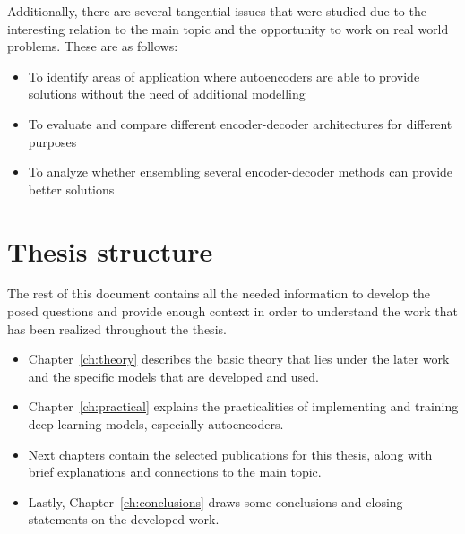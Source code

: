 Additionally, there are several tangential issues that were studied due to the interesting relation to the main topic and the opportunity to work on real world problems. These are as follows:

\begin{itemize}
    \item To identify areas of application where autoencoders are able to provide solutions without the need of additional modelling
    \item To evaluate and compare different encoder-decoder architectures for different purposes 
    \item To analyze whether ensembling several encoder-decoder methods can provide better solutions
\end{itemize}

\section{Thesis structure}

The rest of this document contains all the needed information to develop the posed questions and provide enough context in order to understand the work that has been realized throughout the thesis.

\begin{itemize}
    \item Chapter~\ref{ch:theory} describes the basic theory that lies under the later work and the specific models that are developed and used.
    \item Chapter~\ref{ch:practical} explains the practicalities of implementing and training deep learning models, especially autoencoders.
    \item Next chapters contain the selected publications for this thesis, along with brief explanations and connections to the main topic.
    \item Lastly, Chapter~\ref{ch:conclusions} draws some conclusions and closing statements on the developed work.
\end{itemize}